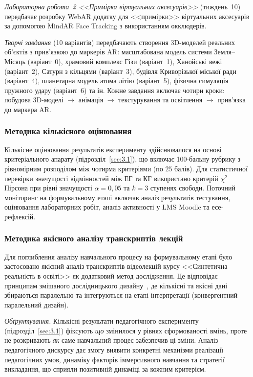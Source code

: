 \textit{Лабораторна робота~2 <<Примірка віртуальних аксесуарів>>} (тиждень~10) передбачає розробку WebAR додатку для <<примірки>> віртуальних аксесуарів за допомогою MindAR Face Tracking з використанням окклюдерів.

\textit{Творчі завдання} (10 варіантів) передбачають створення 3D-моделей реальних об'єктів з прив'язкою до маркерів AR: масштабована модель системи Земля--Місяць (варіант~0), храмовий комплекс Гізи (варіант~1), Ханойські вежі (варіант~2), Сатурн з кільцями (варіант~3), будівля Криворізької міської ради (варіант~4), планетарна модель атома літію (варіант~5), фізична симуляція пружного удару (варіант~6) та ін. Кожне завдання включає чотири кроки: побудова 3D-моделі $\to$ анімація $\to$ текстурування та освітлення $\to$ прив'язка до маркера AR.

\subsubsection{Методика кількісного оцінювання}

Кількісне оцінювання результатів експерименту здійснювалося на основі критеріального апарату (підрозділ~\ref{sec:3.1}), що включає 100-бальну рубрику з рівномірним розподілом між чотирма критеріями (по 25 балів). Для статистичної перевірки значущості відмінностей між ЕГ та КГ використано критерій $\chi^2$ Пірсона при рівні значущості $\alpha = 0{,}05$ та $k = 3$ ступенях свободи. Поточний моніторинг на формувальному етапі включав аналіз результатів тестування, оцінювання лабораторних робіт, аналіз активності у LMS Moodle та есе-рефлексій.

\subsubsection{Методика якісного аналізу транскриптів лекцій}\label{subsec:3.2.qual}

Для поглиблення аналізу навчального процесу на формувальному етапі було застосовано якісний аналіз транскриптів відеолекцій курсу <<Синтетична реальність в освіті>> як додатковий метод дослідження. Це відповідає принципам змішаного дослідницького дизайну~\cite{Creswell2018MixedMethods}, де кількісні та якісні дані збираються паралельно та інтегруються на етапі інтерпретації (конвергентний паралельний дизайн).

\textit{Обґрунтування.} Кількісні результати педагогічного експерименту (підрозділ~\ref{sec:3.1}) фіксують \textit{що} змінилося у рівнях сформованості вмінь, проте не розкривають \textit{як} саме навчальний процес забезпечив ці зміни. Аналіз педагогічного дискурсу дає змогу виявити конкретні механізми реалізації педагогічних умов, динаміку факторів іммерсивного навчання та стратегії викладання, що сприяли позитивній динаміці за кожним критерієм.

